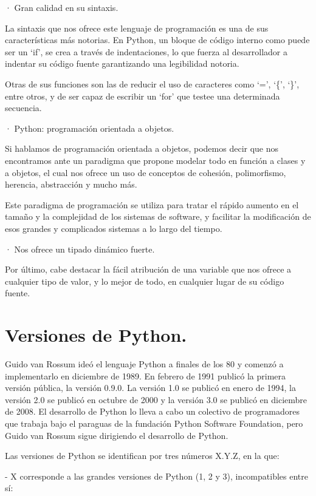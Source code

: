 · Gran calidad en su sintaxis.

La sintaxis que nos ofrece este lenguaje de programación es una de sus características más notorias. En Python, un bloque de código interno como puede ser un ‘if’, se crea a través de indentaciones, lo que fuerza al desarrollador a indentar su código fuente garantizando una legibilidad notoria.

Otras de sus funciones son las de reducir el uso de caracteres como ‘=’, ‘\{’, ‘\}’, entre otros, y de ser capaz de escribir un ‘for’ que testee una determinada secuencia.
 
· Python: programación orientada a objetos.

Si hablamos de programación orientada a objetos, podemos decir que nos encontramos ante un paradigma que propone modelar todo en función a clases y a objetos, el cual nos ofrece un uso de conceptos de cohesión, polimorfismo, herencia, abstracción y mucho más.

Este paradigma de programación se utiliza para tratar el rápido aumento en el tamaño y la complejidad de los sistemas de software, y facilitar la modificación de esos grandes y complicados sistemas a lo largo del tiempo.
 
· Nos ofrece un tipado dinámico fuerte.

Por último, cabe destacar la fácil atribución de una variable que nos ofrece a cualquier tipo de valor, y lo mejor de todo, en cualquier lugar de su código fuente.
\cite{BeJobWebSite}


\section{Versiones de Python.}

Guido van Rossum ideó el lenguaje Python a finales de los 80 y comenzó a implementarlo en diciembre de 1989. En febrero de 1991 publicó la primera versión pública, la versión 0.9.0. La versión 1.0 se publicó en enero de 1994, la versión 2.0 se publicó en octubre de 2000 y la versión 3.0 se publicó en diciembre de 2008. El desarrollo de Python lo lleva a cabo un colectivo de programadores que trabaja bajo el paraguas de la fundación Python Software Foundation, pero Guido van Rossum sigue dirigiendo el desarrollo de Python.

Las versiones de Python se identifican por tres números X.Y.Z, en la que:

- X corresponde a las grandes versiones de Python (1, 2 y 3), incompatibles entre sí:

